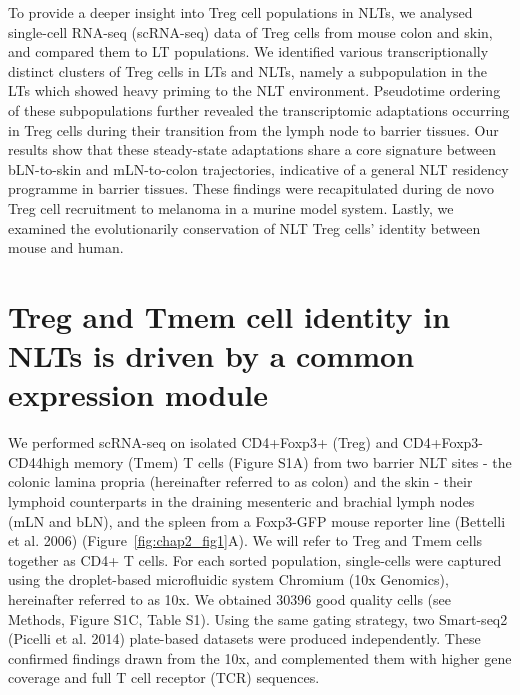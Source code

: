 To provide a deeper insight into Treg cell populations in NLTs, we analysed single-cell RNA-seq (scRNA-seq) data of Treg cells from mouse colon and skin, and compared them to LT populations. We identified various transcriptionally distinct clusters of Treg cells in LTs and NLTs, namely a subpopulation in the LTs which showed heavy priming to the NLT environment. Pseudotime ordering of these subpopulations further revealed the transcriptomic adaptations occurring in Treg cells during their transition from the lymph node to barrier tissues. Our results show that these steady-state adaptations share a core signature between bLN-to-skin and mLN-to-colon trajectories, indicative of a general NLT residency programme in barrier tissues. These findings were recapitulated during de novo Treg cell recruitment to melanoma in a murine model system. Lastly, we examined the evolutionarily conservation of NLT Treg cells’ identity between mouse and human.


\section[Results1]{Treg and Tmem cell identity in NLTs is driven by a common expression module}
\label{section2.2}

We performed scRNA-seq on isolated CD4+Foxp3+ (Treg) and CD4+Foxp3-CD44high memory (Tmem) T cells (Figure S1A) from two barrier NLT sites - the colonic lamina propria (hereinafter referred to as colon) and the skin - their lymphoid counterparts in the draining mesenteric and brachial lymph nodes (mLN and bLN), and the spleen from a Foxp3-GFP mouse reporter line (Bettelli et al. 2006) (Figure~\ref{fig:chap2_fig1}A). We will refer to Treg and Tmem cells together as CD4+ T cells. For each sorted population, single-cells were captured using the droplet-based microfluidic system Chromium (10x Genomics), hereinafter referred to as 10x. We obtained 30396 good quality cells (see Methods, Figure S1C, Table S1). Using the same gating strategy, two Smart-seq2 (Picelli et al. 2014) plate-based datasets were produced independently. These confirmed findings drawn from the 10x, and complemented them with higher gene coverage and full T cell receptor (TCR) sequences.


